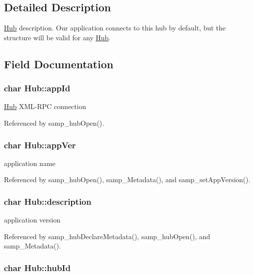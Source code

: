\subsection{Detailed Description}
\hyperlink{structHub}{Hub} description. Our application connects to this hub by default, but the structure will be valid for any \hyperlink{structHub}{Hub}. 

\subsection{Field Documentation}
\hypertarget{structHub_83ae1eed61525e4dd8795d7076b9a844}{
\subsubsection[{appId}]{\setlength{\rightskip}{0pt plus 5cm}char {\bf Hub::appId}}}
\label{structHub_83ae1eed61525e4dd8795d7076b9a844}


\hyperlink{structHub}{Hub} XML-RPC connection 

Referenced by samp\_\-hubOpen().\hypertarget{structHub_b6cbad1270ab46610f03837d4a01648f}{
\subsubsection[{appVer}]{\setlength{\rightskip}{0pt plus 5cm}char {\bf Hub::appVer}}}
\label{structHub_b6cbad1270ab46610f03837d4a01648f}


application name 

Referenced by samp\_\-hubOpen(), samp\_\-Metadata(), and samp\_\-setAppVersion().\hypertarget{structHub_d96b607b83480697b7147f95f84132fb}{
\subsubsection[{description}]{\setlength{\rightskip}{0pt plus 5cm}char {\bf Hub::description}}}
\label{structHub_d96b607b83480697b7147f95f84132fb}


application version 

Referenced by samp\_\-hubDeclareMetadata(), samp\_\-hubOpen(), and samp\_\-Metadata().\hypertarget{structHub_c5ecb8cd6b3d61ab9e0fddfb643c65c3}{
\subsubsection[{hubId}]{\setlength{\rightskip}{0pt plus 5cm}char {\bf Hub::hubId}}}
\label{structHub_c5ecb8cd6b3d61ab9e0fddfb643c65c3}


